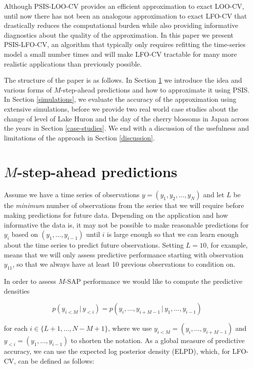 \documentclass[american,]{article}
\begin{document}
Although PSIS-LOO-CV provides an efficient approximation to exact LOO-CV, until
now there has not been an analogous approximation to exact LFO-CV that
drastically reduces the computational burden while also providing informative
diagnostics about the quality of the approximation. In this paper we
present PSIS-LFO-CV, an algorithm that typically only requires refitting the
time-series model a small number times and will make LFO-CV tractable for many
more realistic applications than previously possible.

The structure of the paper is as follows. In Section \ref{m-sap} we introduce
the idea and various forms of \(M\)-step-ahead predictions and how to approximate
it using PSIS. In Section \ref{simulations}, we evaluate the accuracy of the
approximation using extensive simulations, before we provide two real world case
studies about the change of level of Lake Huron and the day of the cherry
blossoms in Japan across the years in Section \ref{case-studies}. We end with a
discussion of the usefulness and limitations of the approach in Section
\ref{discussion}.

\hypertarget{m-sap}{%
\section{\texorpdfstring{\(M\)-step-ahead predictions}{M-step-ahead predictions}}\label{m-sap}}

Assume we have a time series of observations \(y = (y_1, y_2, \ldots, y_N)\)
and let \(L\) be the \emph{minimum} number of observations from the series that
we will require before making predictions for future data. Depending on the
application and how informative the data is, it may not be possible to make
reasonable predictions for \(y_{i}\) based on \((y_1, \dots, y_{i-1})\) until \(i\) is
large enough so that we can learn enough about the time series to predict future
observations. Setting \(L=10\), for example, means that we will only assess
predictive performance starting with observation \(y_{11}\), so that we
always have at least 10 previous observations to condition on.

In order to assess \(M\)-SAP performance we would like to compute the
predictive densities

\begin{equation}
p(y_{i<M} \,|\, y_{<i}) = p(y_i, \ldots, y_{i + M - 1} \,|\, y_{1},...,y_{i-1}) 
\end{equation}

for each \(i \in \{L + 1, \ldots, N - M + 1\}\), where we use
\(y_{i<M} = (y_i, \ldots, y_{i + M - 1})\) and \(y_{<i} = (y_{1}, \ldots, y_{i-1})\)
to shorten the notation. As a global measure of predictive accuracy, we
can use the expected log posterior density (ELPD), which, for LFO-CV, can
be defined as follows:
\end{document}

